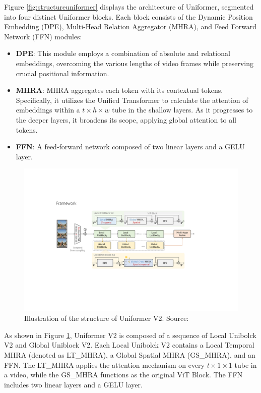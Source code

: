 Figure \ref{fig:structureuniformer} displays the architecture of Uniformer, segmented into four distinct Uniformer blocks. Each block consists of the Dynamic Position Embedding (DPE), Multi-Head Relation Aggregator (MHRA), and Feed Forward Network (FFN) modules:

\begin{itemize}
    \item \textbf{DPE}: This module employs a combination of absolute and relational embeddings, overcoming the various lengths of video frames while preserving crucial positional information.
    \item \textbf{MHRA}: MHRA aggregates each token with its contextual tokens. Specifically, it utilizes the Unified Transformer to calculate the attention of embeddings within a $t\times{h}\times{w}$ tube in the shallow layers. As it progresses to the deeper layers, it broadens its scope, applying global attention to all tokens.
    \item \textbf{FFN}: A feed-forward network composed of two linear layers and a GELU layer.
\end{itemize}

\begin{figure}[ht]
    \centering
    \includegraphics[width=1.0\textwidth]{assets/charts_rw/UniformerV2}
    \caption[The Structure of Uniformer V2]{Illustration of the structure of Uniformer V2. Source: \parencite{li2022uniformerv2}}
    \label{fig:structureuniformerv2}
\end{figure}

As shown in Figure \ref{fig:structureuniformerv2}, Uniformer V2 is composed of a sequence of Local Unibolck V2 and Global Uniblock V2. Each Local Unibolck V2 contains a Local Temporal MHRA (denoted as LT\_MHRA), a Global Spatial MHRA (GS\_MHRA), and an FFN. The LT\_MHRA applies the attention mechanism on every $t\times1\times1$ tube in a video, while the GS\_MHRA functions as the original ViT Block. The FFN includes two linear layers and a GELU layer. 

